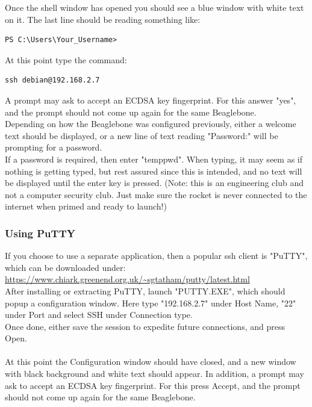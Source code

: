 \documentclass[12pt,article]{memoir}
\begin{document}
\noindent
Once the shell window has opened you should see a blue window with white text on it. The last line should be reading something like:
\begin{lstlisting}
PS C:\Users\Your_Username>
\end{lstlisting}

\noindent
At this point type the command:
\begin{lstlisting}
ssh debian@192.168.2.7
\end{lstlisting}

\noindent
A prompt may ask to accept an ECDSA key fingerprint. For this answer "yes", and the prompt should not come up again for the same Beaglebone.\\

\noindent
Depending on how the Beaglebone was configured previously, either a welcome text should be displayed, or a new line of text reading "Password:" will be prompting for a password.\\
If a password is required, then enter "temppwd". When typing, it may seem as if nothing is getting typed, but rest assured since this is intended, and no text will be displayed until the enter key is pressed. (Note: this is an engineering club and not a computer security club. Just make sure the rocket is never connected to the internet when primed and ready to launch!)

\subsubsection{Using PuTTY}
If you choose to use a separate application, then a popular ssh client is "PuTTY", which can be downloaded under:\\
\url{https://www.chiark.greenend.org.uk/~sgtatham/putty/latest.html}\\

\noindent
After installing or extracting PuTTY, launch "PUTTY.EXE", which should popup a configuration window. Here type "192.168.2.7" under Host Name, "22" under Port and select SSH under Connection type.\\
Once done, either save the session to expedite future connections, and press Open.\\\\

\noindent
At this point the Configuration window should have closed, and a new window with black background and white text should appear. In addition, a prompt may ask to accept an ECDSA key fingerprint. For this press Accept, and the prompt should not come up again for the same Beaglebone.\\
\end{document}
